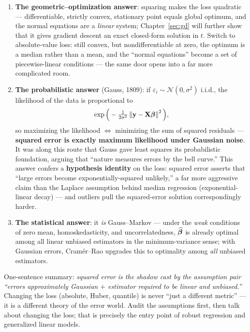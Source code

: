 \begin{enumerate}[label=(\arabic*)]
  \item \textbf{The geometric--optimization answer}: squaring makes the loss quadratic — differentiable, strictly convex, stationary point equals global optimum, and the normal equations are a \textit{linear} system; Chapter~\ref{sec:gd} will further show that it gives gradient descent an exact closed-form solution in $t$. Switch to absolute-value loss: still convex, but nondifferentiable at zero, the optimum is a median rather than a mean, and the ``normal equations'' become a set of piecewise-linear conditions — the same door opens into a far more complicated room.
  \item \textbf{The probabilistic answer} (Gauss, 1809): if $\varepsilon_i \sim \mathcal{N}(0, \sigma^2)$ i.i.d., the likelihood of the data is proportional to
  \[
    \exp\Big( -\tfrac{1}{2\sigma^2} \left\lVert \mathbf{y} - \mathbf{X}\bm{\beta} \right\rVert^2 \Big),
  \]
  so maximizing the likelihood $\Longleftrightarrow$ minimizing the sum of squared residuals — \textbf{squared error is exactly maximum likelihood under Gaussian noise}\cite{gauss1809}. It was along this route that Gauss gave least squares its probabilistic foundation, arguing that ``nature measures errors by the bell curve.'' This answer confers a \textbf{hypothesis identity} on the loss: squared error asserts that ``large errors become exponentially-squared unlikely,'' a far more aggressive claim than the Laplace assumption behind median regression (exponential-linear decay) — and outliers pull the squared-error solution correspondingly harder.
  \item \textbf{The statistical answer}: it \emph{is} Gauss--Markov — under the \textit{weak} conditions of zero mean, homoskedasticity, and uncorrelatedness, $\widehat{\bm{\beta}}$ is already optimal among all linear unbiased estimators in the minimum-variance sense; with Gaussian errors, Cram\'er--Rao upgrades this to optimality among \textit{all} unbiased estimators.
\end{enumerate}

One-sentence summary: \textit{squared error is the shadow cast by the assumption pair ``errors approximately Gaussian $+$ estimator required to be linear and unbiased.''} Changing the loss (absolute, Huber, quantile) is never ``just a different metric'' — it is a different theory of the error world. Audit the assumptions first, then talk about changing the loss; that is precisely the entry point of robust regression and generalized linear models.

